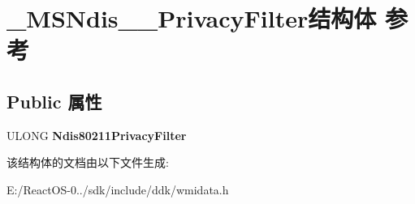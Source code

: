 \hypertarget{struct___m_s_ndis__80211___privacy_filter}{}\section{\+\_\+\+M\+S\+Ndis\+\_\+\_\+\+Privacy\+Filter结构体 参考}
\label{struct___m_s_ndis__80211___privacy_filter}
\subsection*{Public 属性}
\begin{DoxyCompactItemize}
\item 
\mbox{\label{struct___m_s_ndis__80211___privacy_filter_a78ac715fbb95d68c36390bd111f4a684}} 
U\+L\+O\+NG {\bfseries Ndis80211\+Privacy\+Filter}
\end{DoxyCompactItemize}


该结构体的文档由以下文件生成\+:\begin{DoxyCompactItemize}
\item 
E\+:/\+React\+O\+S-\/0../sdk/include/ddk/wmidata.\+h\end{DoxyCompactItemize}
